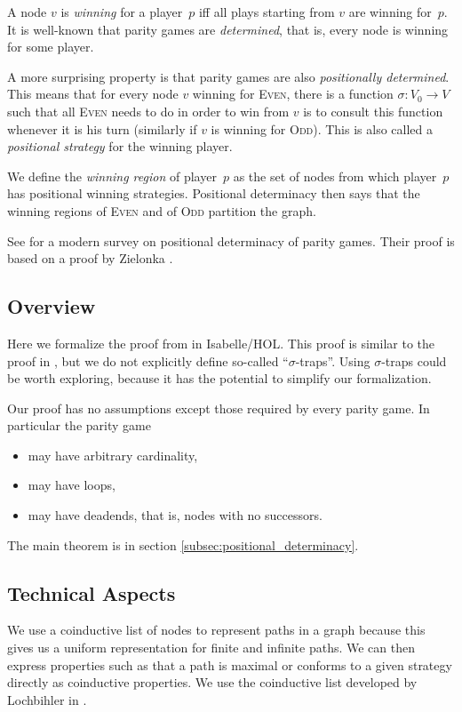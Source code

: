 \documentclass[11pt,a4paper]{scrartcl}
\newcommand{\Even}{\textsc{Even}\xspace}
\newcommand{\Odd}{\textsc{Odd}\xspace}
\begin{document}
A node $v$ is \emph{winning} for a player~$p$ iff all plays starting
from $v$ are winning for~$p$.  It is well-known that parity games are
\emph{determined}, that is, every node is winning for some player.

A more surprising property is that parity games are also
\emph{positionally determined}.  This means that for every node $v$
winning for \Even, there is a function $\sigma: V_0 \to V$ such that
all \Even needs to do in order to win from $v$ is to consult this
function whenever it is his turn (similarly if $v$ is winning for
\Odd).  This is also called a \emph{positional strategy} for the
winning player.

We define the \emph{winning region} of player~$p$ as the set of nodes
from which player~$p$ has positional winning strategies.  Positional
determinacy then says that the winning regions of \Even and of \Odd
partition the graph.

See \cite{automata2002/kuesters} for a modern survey on positional
determinacy of parity games.  Their proof is based on a proof by
Zielonka \cite{zielonka1998}.

\subsection{Overview}

Here we formalize the proof from \cite{kreutzer2015} in Isabelle/HOL.
This proof is similar to the proof in \cite{automata2002/kuesters},
but we do not explicitly define so-called ``$\sigma$-traps''.  Using
$\sigma$-traps could be worth exploring, because it has the potential
to simplify our formalization.

Our proof has no assumptions except those required by every parity
game.  In particular the parity game
\begin{itemize}
\item may have arbitrary cardinality,
\item may have loops,
\item may have deadends, that is, nodes with no successors.
\end{itemize}

The main theorem is in section \ref{subsec:positional_determinacy}.

\subsection{Technical Aspects}

We use a coinductive list of nodes to represent paths in a graph
because this gives us a uniform representation for finite and infinite
paths.  We can then express properties such as that a path is maximal
or conforms to a given strategy directly as coinductive properties.
We use the coinductive list developed by Lochbihler in
\cite{Coinductive-AFP}.
\end{document}
